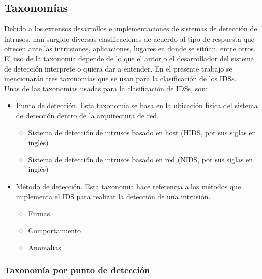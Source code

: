 \subsection{Taxonomías}

Debido a los extensos desarrollos e implementaciones de sistemas de detección de intrusos, han surgido diversas clasificaciones de acuerdo al tipo de respuesta que ofrecen ante las intrusiones,  aplicaciones, lugares en donde se sitúan, entre otros. El uso de la taxonomía depende de lo que el autor o el desarrollador del sistema de detección interprete o quiera dar a entender. En el presente trabajo se mencionarán tres taxonomías que se usan para la clasificación de los IDSs.\\

Unas de las taxonomías usadas para la clasificación de IDSs, son: \\



\begin{itemize}
	\item Punto de detección. Esta taxonomía se basa en la ubicación física del sistema de detección dentro de la arquitectura de red.
	\begin{itemize}
		\item Sistema de detección de intrusos basado en host (HIDS, por sus siglas en inglés)
		\item Sistema de detección de intrusos basado en red (NIDS, por sus siglas en inglés)
	\end{itemize}
	
	\item Método de detección. Esta taxonomía hace referencia a los métodos que implementa el IDS para realizar la detección de una intrusión.
	\begin{itemize}
		\item Firmas
		\item Comportamiento
		\item Anomalías
	\end{itemize}
\end{itemize}



\subsubsection{Taxonomía por punto de detección}

